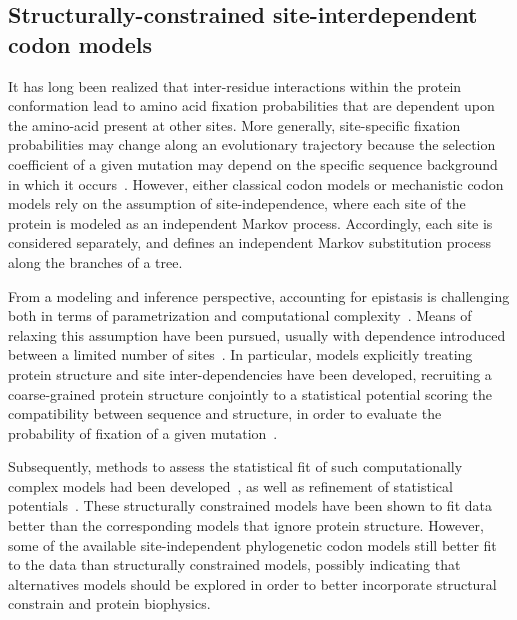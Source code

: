 \subsection{Structurally-constrained site-interdependent codon models}

It has long been realized that inter-residue interactions within the protein conformation lead to amino acid fixation probabilities that are dependent upon the amino-acid present at other sites.
More generally, site-specific fixation probabilities may change along an evolutionary trajectory because the selection coefficient of a given mutation may depend on the specific sequence background in which it occurs~\citep{Goldstein2016}.
However, either classical codon models or mechanistic codon models rely on the assumption of site-independence, where each site of the protein is modeled as an independent Markov process.
Accordingly, each site is considered separately, and defines an independent Markov substitution process along the branches of a tree.

From a modeling and inference perspective, accounting for epistasis is challenging both in terms of parametrization and computational complexity~\citep{Manhart2014}.
Means of relaxing this assumption have been pursued, usually with dependence introduced between a limited number of sites~\citep{Felsenstein1996}.
In particular, models explicitly treating protein structure and site inter-dependencies have been developed, recruiting a coarse-grained protein structure conjointly to a statistical potential scoring the compatibility between sequence and structure, in order to evaluate the probability of fixation of a given mutation~\citep{Robinson2003, Rodrigue2005}.

Subsequently, methods to assess the statistical fit of such computationally complex models had been developed~\citep{Rodrigue2009}, as well as refinement of statistical potentials~\citep{Kleinman2010}.
These structurally constrained models have been shown to fit data better than the corresponding models that ignore protein structure.
However, some of the available site-independent phylogenetic codon models still better fit to the data than structurally constrained models, possibly indicating that alternatives models should be explored in order to better incorporate structural constrain and protein biophysics.


